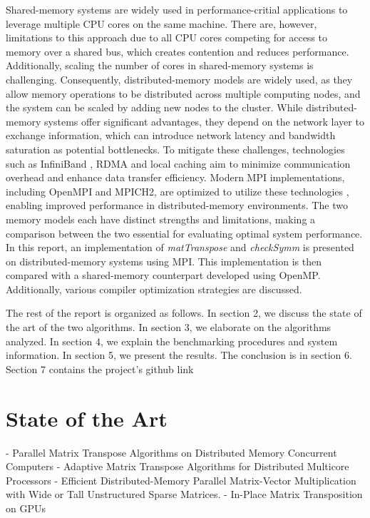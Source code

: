 \documentclass[conference]{IEEEtran}
\begin{document}
Shared-memory systems are widely used in performance-critial applications
to leverage multiple CPU cores on the same machine.
There are, however, limitations to this approach due to all CPU cores
competing for access to memory over a shared bus, which creates contention
and reduces performance. Additionally, scaling the number of cores in
shared-memory systems is challenging. Consequently, distributed-memory
models are widely used, as they allow memory operations to be
distributed across multiple computing nodes, and the system can
be scaled by adding new nodes to the cluster. While distributed-memory
systems offer significant advantages, they
depend on the network layer to exchange information, which can
introduce network latency and bandwidth saturation as potential
bottlenecks. To mitigate these challenges, technologies such as
InfiniBand \cite{b0}, RDMA \cite{b-1} and local caching \cite{b-2}
aim to minimize communication overhead and
enhance data transfer efficiency. Modern MPI implementations,
including OpenMPI and MPICH2, are optimized to utilize these
technologies \cite{b1} \cite{b2}, enabling improved performance in
distributed-memory environments. The two memory models each
have distinct strengths and limitations,
making a comparison between the two essential for evaluating optimal
system performance. In this report, an implementation of \textit{matTranspose}
and \textit{checkSymm} is presented on distributed-memory systems using MPI.
This implementation is then compared with a shared-memory counterpart
developed using OpenMP. Additionally, various compiler
optimization strategies are discussed.

The rest of the report is organized as follows.
In section 2, we discuss the state of the art of the two algorithms.
In section 3, we elaborate on the algorithms analyzed.
In section 4, we explain the benchmarking procedures and system
information. In section 5, we present the results. The conclusion
is in section 6. Section 7 contains the project's github link

\section{State of the Art}

\iffalse
- Parallel Matrix Transpose Algorithms on Distributed Memory Concurrent
  Computers
- Adaptive Matrix Transpose Algorithms for Distributed Multicore Processors
- Efficient Distributed-Memory Parallel Matrix-Vector Multiplication with
  Wide or Tall Unstructured Sparse Matrices.
- In-Place Matrix Transposition on GPUs
\end{document}

